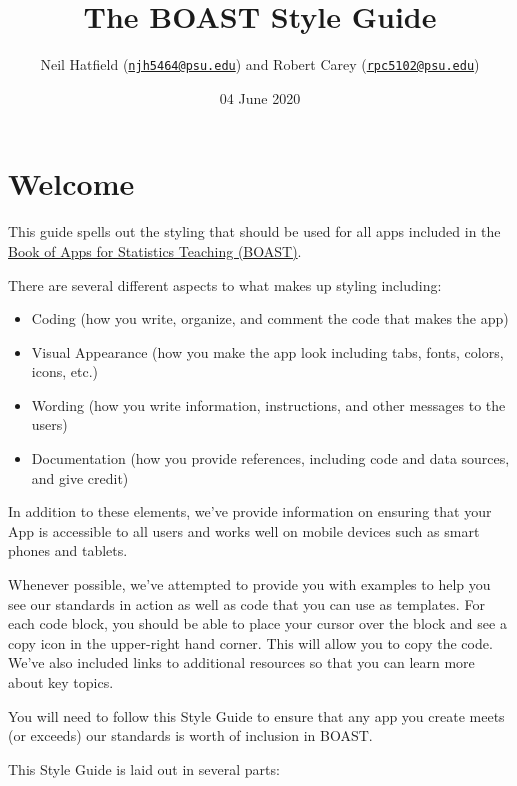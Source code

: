 \documentclass[
]{book}
\title{The BOAST Style Guide}
\author{Neil Hatfield (\href{mailto:njh5464@psu.edu}{\nolinkurl{njh5464@psu.edu}}) and Robert Carey (\href{mailto:rpc5102@psu.edu}{\nolinkurl{rpc5102@psu.edu}})}
\date{04 June 2020}
\providecommand{\tightlist}{%
  \setlength{\itemsep}{0pt}\setlength{\parskip}{0pt}}
\begin{document}
\maketitle

{
\setcounter{tocdepth}{1}
\tableofcontents
}
\hypertarget{welcome}{%
\chapter*{Welcome}\label{welcome}}

This guide spells out the styling that should be used for all apps included in the \href{https://github.com/EducationShinyAppTeam/BOAST}{Book of Apps for Statistics Teaching (BOAST)}.

There are several different aspects to what makes up styling including:

\begin{itemize}
\tightlist
\item
  Coding (how you write, organize, and comment the code that makes the app)
\item
  Visual Appearance (how you make the app look including tabs, fonts, colors, icons, etc.)
\item
  Wording (how you write information, instructions, and other messages to the users)
\item
  Documentation (how you provide references, including code and data sources, and give credit)
\end{itemize}

In addition to these elements, we've provide information on ensuring that your App is accessible to all users and works well on mobile devices such as smart phones and tablets.

Whenever possible, we've attempted to provide you with examples to help you see our standards in action as well as code that you can use as templates. For each code block, you should be able to place your cursor over the block and see a copy icon in the upper-right hand corner. This will allow you to copy the code. We've also included links to additional resources so that you can learn more about key topics.

You will need to follow this Style Guide to ensure that any app you create meets (or exceeds) our standards is worth of inclusion in BOAST.

This Style Guide is laid out in several parts:
\end{document}
